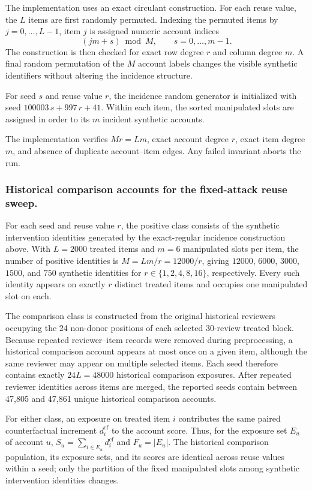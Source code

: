 The implementation uses an exact circulant construction. For each reuse
value, the $L$ items are first randomly permuted. Indexing the permuted items
by $j=0,\ldots,L-1$, item $j$ is assigned numeric account indices
\[
(jm+s)\bmod M,
\qquad
s=0,\ldots,m-1.
\]
The construction is then checked for exact row degree $r$ and column degree
$m$. A final random permutation of the $M$ account labels changes the visible
synthetic identifiers without altering the incidence structure.

For seed $s$ and reuse value $r$, the incidence random generator is initialized
with seed $100003\,s+997\,r+41$. Within each item, the sorted manipulated
slots are assigned in order to its $m$ incident synthetic accounts.

The implementation verifies $Mr=Lm$, exact account degree $r$, exact item
degree $m$, and absence of duplicate account--item edges. Any failed invariant
aborts the run.


\subsubsection{Historical comparison accounts for the fixed-attack reuse sweep.}

For each seed and reuse value $r$, the positive class consists of the
synthetic intervention identities generated by the exact-regular incidence
construction above. With $L=2000$ treated items and $m=6$ manipulated slots
per item, the number of positive identities is
$M=Lm/r=12000/r$, giving $12000$, $6000$, $3000$, $1500$, and $750$
synthetic identities for $r\in\{1,2,4,8,16\}$, respectively. Every such
identity appears on exactly $r$ distinct treated items and occupies one
manipulated slot on each.

The comparison class is constructed from the original historical reviewers
occupying the 24 non-donor positions of each selected 30-review treated
block. Because repeated reviewer--item records were removed during
preprocessing, a historical comparison account appears at most once on a
given item, although the same reviewer may appear on multiple selected
items. Each seed therefore contains exactly $24L=48000$ historical
comparison exposures. After repeated reviewer identities across items are
merged, the reported seeds contain between 47,805 and 47,861 unique
historical comparison accounts.

For either class, an exposure on treated item $i$ contributes the same paired
counterfactual increment $d_i^{\mathrm{cf}}$ to the account score. Thus, for
the exposure set $E_u$ of account $u$,
$S_u=\sum_{i\in E_u}d_i^{\mathrm{cf}}$ and
$F_u=|E_u|$. The historical comparison population, its exposure sets, and
its scores are identical across reuse values within a seed; only the
partition of the fixed manipulated slots among synthetic intervention
identities changes.

